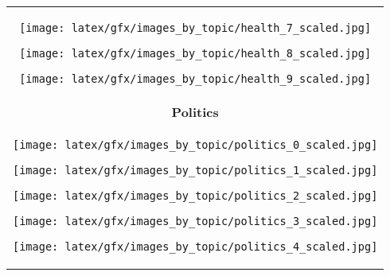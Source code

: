 \begin{table*}[ht]
\begin{tabular}{c}
\begin{minipage}{0.08\textwidth}
                        \centering
                        \texttt{[image: latex/gfx/images\_by\_topic/health\_7\_scaled.jpg]}
                    \end{minipage}
                    \begin{minipage}{0.08\textwidth}
                        \centering
                        \texttt{[image: latex/gfx/images\_by\_topic/health\_8\_scaled.jpg]}
                    \end{minipage}
                    \begin{minipage}{0.08\textwidth}
                        \centering
                        \texttt{[image: latex/gfx/images\_by\_topic/health\_9\_scaled.jpg]}
                    \end{minipage}
                \\
                \textbf{Politics}  \\ \cmidrule(lr){1-1}
                    \begin{minipage}{0.08\textwidth}
                        \centering
                        \texttt{[image: latex/gfx/images\_by\_topic/politics\_0\_scaled.jpg]}
                    \end{minipage}
                    \hfill
                    \begin{minipage}{0.08\textwidth}
                        \centering
                        \texttt{[image: latex/gfx/images\_by\_topic/politics\_1\_scaled.jpg]}
                    \end{minipage}
                    \hfill
                    \begin{minipage}{0.08\textwidth}
                        \centering
                        \texttt{[image: latex/gfx/images\_by\_topic/politics\_2\_scaled.jpg]}
                    \end{minipage}
                    \hfill
                    \begin{minipage}{0.08\textwidth}
                        \centering
                        \texttt{[image: latex/gfx/images\_by\_topic/politics\_3\_scaled.jpg]}
                    \end{minipage}
                    \hfill
                    \begin{minipage}{0.08\textwidth}
                        \centering
                        \texttt{[image: latex/gfx/images\_by\_topic/politics\_4\_scaled.jpg]}

\end{minipage}
\end{tabular}
\end{table*}
